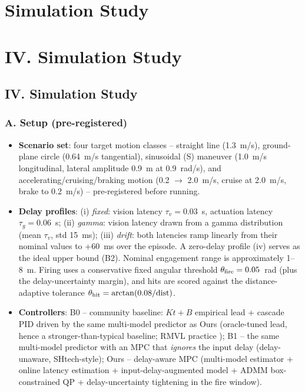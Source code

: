 \documentclass[journal]{IEEEtran}
\begin{document}
\section{Simulation Study}
\section*{IV. Simulation Study}



\subsection*{IV. Simulation Study}

\subsubsection*{A. Setup (pre-registered)}

\begin{itemize}
\item \textbf{Scenario set}: four target motion classes -- straight line (1.3~m/s), ground-plane circle (0.64~m/s tangential), sinusoidal (S) maneuver (1.0~m/s longitudinal, lateral amplitude 0.9~m at 0.9~rad/s), and accelerating/cruising/braking motion (0.2 $\rightarrow$ 2.0~m/s, cruise at 2.0~m/s, brake to 0.2~m/s) -- pre-registered before running.
\end{itemize}

\begin{itemize}
\item \textbf{Delay profiles}: (i) \textit{fixed}: vision latency $\tau_v=0.03$~s, actuation latency $\tau_g=0.06$~s; (ii) \textit{gamma}: vision latency drawn from a gamma distribution (mean $\tau_v$, std 15~ms); (iii) \textit{drift}: both latencies ramp linearly from their nominal values to +60~ms over the episode. A zero-delay profile (iv) serves as the ideal upper bound (B2). Nominal engagement range is approximately 1--8~m. Firing uses a conservative fixed angular threshold $\theta_{\rm fire}=0.05$~rad (plus the delay-uncertainty margin), and hits are scored against the distance-adaptive tolerance $\theta_{\rm hit}=\arctan(0.08/\text{dist})$.
\end{itemize}

\begin{itemize}
\item \textbf{Controllers}: B0 -- community baseline: $Kt+B$ empirical lead + cascade PID driven by the same multi-model predictor as Ours (oracle-tuned lead, hence a stronger-than-typical baseline; RMVL practice \cite{ref1}); B1 -- the same multi-model predictor with an MPC that \textit{ignores} the input delay (delay-unaware, SHtech-style); Ours -- delay-aware MPC (multi-model estimator + online latency estimation + input-delay-augmented model + ADMM box-constrained QP + delay-uncertainty tightening in the fire window).
\end{itemize}
\end{document}
